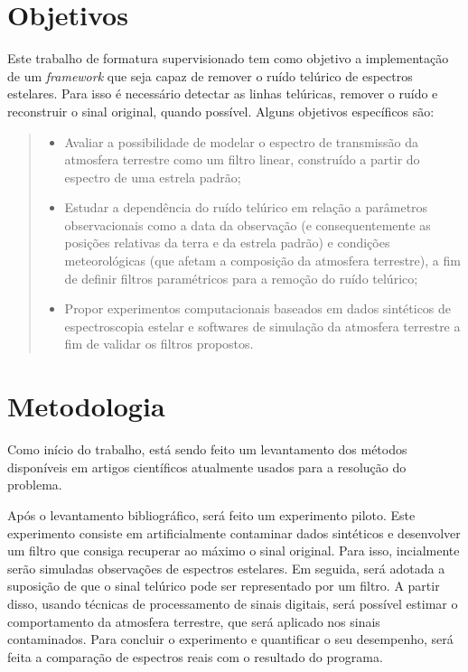 \documentclass[11pt,twoside,a4paper]{article}
\begin{document}
\section{Objetivos}
\doublespacing
Este trabalho de formatura supervisionado tem como objetivo a implementação  de um \textit{framework} que seja capaz de remover o ruído telúrico de espectros estelares. Para isso é necessário detectar as linhas telúricas, remover o ruído e reconstruir o sinal original, quando possível. Alguns objetivos específicos são:

\begin{quote}\begin{itemize}
    \item Avaliar a possibilidade de modelar o espectro de transmissão da atmosfera terrestre como um filtro linear, construído a partir do espectro de uma estrela padrão;
    \item Estudar a dependência do ruído telúrico em relação a parâmetros observacionais como a data da observação (e consequentemente as posições relativas da terra e da estrela padrão) e condições meteorológicas (que afetam a composição da atmosfera terrestre), a fim de definir filtros paramétricos para a remoção do ruído telúrico;
    \item Propor experimentos computacionais baseados em dados sintéticos de espectroscopia estelar e softwares de simulação da atmosfera terrestre \cite{bertaux2014tapas} a fim de validar os filtros propostos.
\end{itemize}\end{quote}



\section{Metodologia}
\doublespacing
Como início do trabalho, está sendo feito um levantamento dos métodos disponíveis em artigos científicos atualmente usados para a resolução do problema. 

Após o levantamento bibliográfico, será feito um experimento piloto. Este experimento consiste em artificialmente contaminar dados sintéticos e desenvolver um filtro que consiga recuperar ao máximo o sinal original. Para isso, incialmente serão simuladas observações de espectros estelares. Em seguida, será adotada a suposição de que o sinal telúrico pode ser representado por um filtro. A partir disso, usando técnicas de processamento de sinais digitais, será possível estimar o comportamento da atmosfera terrestre, que será aplicado nos sinais contaminados. Para concluir o experimento e quantificar o seu desempenho, será feita a comparação de espectros reais com o resultado do programa.
\end{document}
